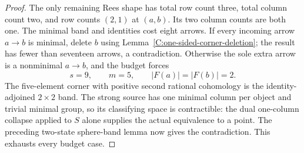 \begin{proof}
The only remaining Rees shape has total row count three,
total column count two, and row counts $(2,1)$ at $(a,b)$.
Its two column counts are both one. The minimal band and
identities cost eight arrows. If every incoming arrow
$a\to b$ is minimal, delete $b$ using
Lemma~\ref{C:one-sided-corner-deletion}; the result has fewer
than seventeen arrows, a contradiction. Otherwise the sole
extra arrow is a nonminimal $a\to b$, and the budget forces
\[
 s=9,\qquad m=5,\qquad |F(a)|=|F(b)|=2.
\]
The five-element corner with positive second rational
cohomology is the identity-adjoined $2\times2$ band.
The strong source has one minimal column per object and
trivial minimal group, so its classifying space is
contractible: the dual one-column collapse applied to $S$
alone supplies the actual equivalence to a point.
The preceding two-state sphere-band lemma now gives the
contradiction. This exhausts every budget case.
\end{proof}
